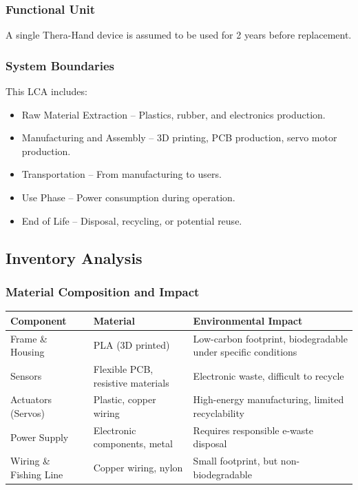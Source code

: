 \documentclass{article}
\begin{document}
\subsubsection{Functional Unit}
A single Thera-Hand device is assumed to be used for 2 years before replacement.
\subsubsection{System Boundaries}
This LCA includes:
\begin{itemize}
\item Raw Material Extraction – Plastics, rubber, and electronics production.
\item Manufacturing and Assembly – 3D printing, PCB production, servo motor production.
\item Transportation – From manufacturing to users.
\item Use Phase – Power consumption during operation.
\item End of Life – Disposal, recycling, or potential reuse.
\end{itemize}
\subsection{Inventory Analysis}
\subsubsection{Material Composition and Impact}
\begin{table}[h]
    \hspace*{-3.5cm}
    \centering
    \begin{tabular}{|l|l|l|}
        \hline
        \textbf{Component} & \textbf{Material} & \textbf{Environmental Impact} \\ 
        \hline
        Frame \& Housing & PLA (3D printed) & Low-carbon footprint, biodegradable under specific conditions \\ 
        \hline
        Sensors & Flexible PCB, resistive materials & Electronic waste, difficult to recycle \\ 
        \hline
        Actuators (Servos) & Plastic, copper wiring & High-energy manufacturing, limited recyclability \\ 
        \hline
        Power Supply & Electronic components, metal & Requires responsible e-waste disposal \\ 
        \hline
        Wiring \& Fishing Line & Copper wiring, nylon & Small footprint, but non-biodegradable \\ 
        \hline
    \end{tabular}
    \label{tab:material_composition}
\end{table}
\end{document}
